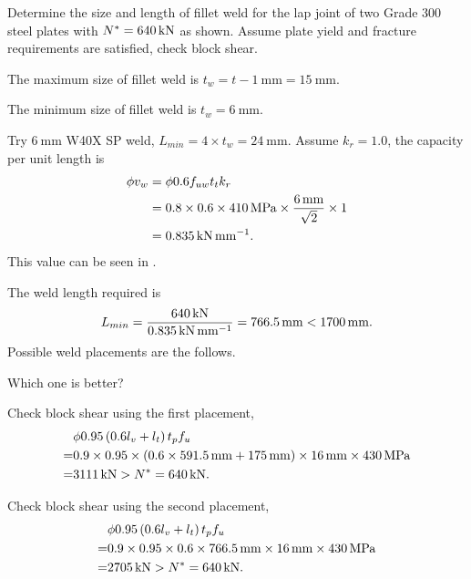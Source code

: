 \begin{exmp} Determine the size and length of fillet weld for the lap joint of two Grade 300 steel plates with $N^*=\SI{640}{\kilo\newton}$ as shown. Assume plate yield and fracture requirements are satisfied, check block shear.
\begin{figure}[H]

\end{figure}
\end{exmp}
\begin{solution}
The maximum size of fillet weld is $t_w=t-\SI{1}{\mm}=\SI{15}{\mm}$.

The minimum size of fillet weld is $t_w=\SI{6}{\mm}$.

Try $\SI{6}{\mm}$ W40X SP weld, $L_{min}=4\times{}t_w=\SI{24}{\mm}$. Assume $k_r=1.0$, the capacity per unit length is
\begin{align*}
\phi{}v_w&=\phi{}0.6f_{uw}t_tk_r\\
&=0.8\times0.6\times\SI{410}{\mega\pascal}\times\dfrac{\SI{6}{\milli\meter}}{\sqrt{2}}\times1\\
&=\SI{0.835}{\kilo\newton\per\milli\meter}.
\end{align*}
This value can be seen in .

The weld length required is
\begin{gather*}
L_{min}=\dfrac{\SI{640}{\kilo\newton}}{\SI{0.835}{\kilo\newton\per\milli\meter}}=\SI{766.5}{\milli\meter}<\SI{1700}{\milli\meter}.
\end{gather*}
Possible weld placements are the follows.
\begin{figure}[H]
\centering

\end{figure}
Which one is better?

Check block shear using the first placement,
\begin{align*}
&\phi0.95\left(0.6l_{v}+l_{t}\right)t_pf_u\\=&0.9\times0.95\times\left(0.6\times\SI{591.5}{\milli\meter}+\SI{175}{\milli\meter}\right)\times\SI{16}{\milli\meter}\times\SI{430}{\mega\pascal}
\\=&\SI{3111}{\kilo\newton}>N^*=\SI{640}{\kilo\newton}.
\end{align*}

Check block shear using the second placement,
\begin{align*}
&\phi0.95\left(0.6l_{v}+l_{t}\right)t_pf_u\\=&0.9\times0.95\times0.6\times\SI{766.5}{\milli\meter}\times\SI{16}{\milli\meter}\times\SI{430}{\mega\pascal}
\\=&\SI{2705}{\kilo\newton}>N^*=\SI{640}{\kilo\newton}.
\end{align*}
\end{solution}
